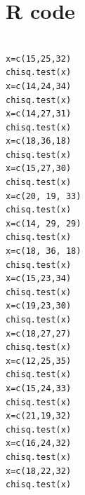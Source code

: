 \documentclass[oneside,12pt]{report}
\begin{document}
\chapter{R code}\label{R}
\begin{lstlisting}[caption= R code for implementing Pearson's chi-squared test, label = Rcode]

x=c(15,25,32)
chisq.test(x)
x=c(14,24,34)
chisq.test(x)
x=c(14,27,31)
chisq.test(x)
x=c(18,36,18)
chisq.test(x)
x=c(15,27,30)
chisq.test(x)
x=c(20, 19, 33)
chisq.test(x)
x=c(14, 29, 29)
chisq.test(x)
x=c(18, 36, 18)
chisq.test(x)
x=c(15,23,34)
chisq.test(x)
x=c(19,23,30)
chisq.test(x)
x=c(18,27,27)
chisq.test(x)
x=c(12,25,35)
chisq.test(x)
x=c(15,24,33)
chisq.test(x)
x=c(21,19,32)
chisq.test(x)
x=c(16,24,32)
chisq.test(x)
x=c(18,22,32)
chisq.test(x)
\end{lstlisting}
\vspace{5pt}



\renewcommand\bibname{Selected Bibliography Including Cited Works}
\nocite{*}  %

\end{document}
